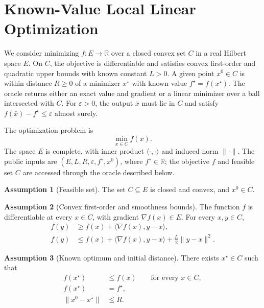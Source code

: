 \documentclass[10pt]{article}
\theoremstyle{definition}
\newtheorem{assumption}{Assumption}
\begin{document}
\section*{Known-Value Local Linear Optimization}
We consider minimizing $f:E\to\mathbb{R}$ over a closed convex set $C$ in a real Hilbert space $E$. On $C$, the objective is differentiable and satisfies convex first-order and quadratic upper bounds with known constant $L>0$. A given point $x^0\in C$ is within distance $R\geq0$ of a minimizer $x^\star$ with known value $f^\star=f(x^\star)$. The oracle returns either an exact value and gradient or a linear minimizer over a ball intersected with $C$. For $\varepsilon>0$, the output $\bar{x}$ must lie in $C$ and satisfy $f(\bar{x})-f^\star\leq\varepsilon$ almost surely.

The optimization problem is
\[
\min_{x\in C} f(x).
\]
The space $E$ is complete, with inner product $\langle\cdot,\cdot\rangle$ and induced norm $\|\cdot\|$. The public inputs are $(E,L,R,\varepsilon,f^\star,x^0)$, where $f^\star\in\mathbb{R}$; the objective $f$ and feasible set $C$ are accessed through the oracle described below.

\begin{assumption}[Feasible set]
The set $C\subseteq E$ is closed and convex, and $x^0\in C$.
\end{assumption}

\begin{assumption}[Convex first-order and smoothness bounds]
The function $f$ is differentiable at every $x\in C$, with gradient $\nabla f(x)\in E$. For every $x,y\in C$,
\begin{align*}
f(y) &\geq f(x)+\langle\nabla f(x),y-x\rangle,\\
f(y) &\leq f(x)+\langle\nabla f(x),y-x\rangle
       +\frac{L}{2}\|y-x\|^2.
\end{align*}
\end{assumption}

\begin{assumption}[Known optimum and initial distance]
There exists $x^\star\in C$ such that
\begin{align*}
f(x^\star) &\leq f(x) \qquad \text{for every }x\in C,\\
f(x^\star) &= f^\star,\\
\|x^0-x^\star\| &\leq R.
\end{align*}
\end{assumption}
\end{document}

